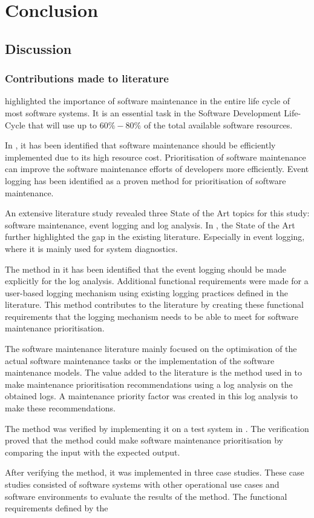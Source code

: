 \chapter{Conclusion}
\label{chap:4}

\section{Discussion}

\subsection{Contributions made to literature}
 highlighted the importance of software maintenance in the entire life cycle of most software systems. It is an essential task in the Software Development Life-Cycle that will use up to $60\%-80\%$ of the total available software resources.\par In , it has been identified that software maintenance should be efficiently implemented due to its high resource cost. Prioritisation of software maintenance can improve the software maintenance efforts of developers more efficiently. Event logging has been identified as a proven method for prioritisation of software maintenance.\par An extensive literature study revealed three State of the Art topics for this study: software maintenance, event logging and log analysis. In , the State of the Art further highlighted the gap in the existing literature. Especially in event logging, where it is mainly used for system diagnostics.\par The method in  it has been identified that the event logging should be made explicitly for the log analysis. Additional functional requirements were made for a user-based logging mechanism using existing logging practices defined in the literature. This method contributes to the literature by creating these functional requirements that the logging mechanism needs to be able to meet for software maintenance prioritisation. \par The software maintenance literature mainly focused on the optimisation of the actual software maintenance tasks or the implementation of the software maintenance models. The value added to the literature is the method used in  to make maintenance prioritisation recommendations using a log analysis on the obtained logs. A maintenance priority factor was created in this log analysis to make these recommendations.\par The method was verified by implementing it on a test system in . The verification proved that the method could make software maintenance prioritisation by comparing the input with the expected output.\par After verifying the method, it was implemented in three case studies. These case studies consisted of software systems with other operational use cases and software environments to evaluate the results of the method. The functional requirements defined by the 